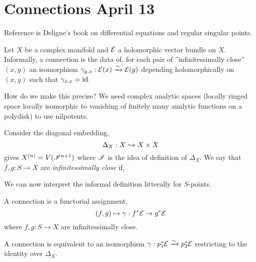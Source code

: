 \documentclass[12pt]{article}
\begin{document}
 
\section{Connections April 13}

\begin{rmk}
Reference is Deligne's book on differential equations and regular singular points.
\end{rmk}

\begin{defn}
Let $X$ be a complex manifold and $\mathcal{E}$ a holomorphic vector bundle on $X$. Informally, a connection is the data of, for each pair of ''infinitessimally close'' $(x,y)$ an isomorphism $\gamma_{y,x} : \mathcal{E}(x) \xrightarrow{\sim} \mathcal{E}(y)$ depending holomorphically on $(x,y)$ such that $\gamma_{x,x} = \mathrm{id}$. 
\end{defn}

\begin{rmk}
How do we make this precise? We need complex analytic spaces (locally ringed space locally isomorphic to vanishing of finitely many analytic functions on a polydisk) to use nilpotents.
\end{rmk}

\begin{defn}
Consider the diagonal embedding,
\[ \Delta_X : X \hookrightarrow X \times X \]
gives $X^{(n)} = V(\mathscr{I}^{n+1})$ where $\mathscr{I}$ is the idea of definition of $\Delta_X$. We say that $f,g : S \to X$ are \textit{infinitessimally close} if,
\begin{center}
\end{center}
\end{defn}

\begin{rmk}
We can now interpret the informal definition litterally for $S$-points. 
\end{rmk}

\begin{defn}
A connection is a functorial assignment,
\[ (f,g) \mapsto \gamma : f^* \mathcal{E} \to g^* \mathcal{E} \]
where $f,g : S \to X$ are infinitessimally close. 
\end{defn}

\begin{prop}
A connection is equivalent to an isomorphism $\gamma : p_1^* \mathcal{E} \xrightarrow{\sim} p_2^* \mathcal{E}$ restricting to the identity over $\Delta_X$. 
\end{prop}
\end{document}
